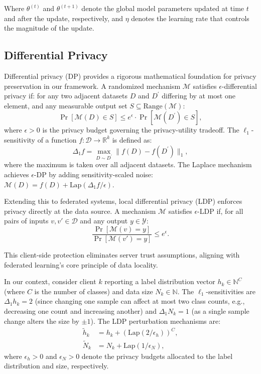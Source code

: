 \documentclass[journal,twoside,web]{ieeecolor}
\begin{document}
Where $\theta^{(t)}$ and $\theta^{(t+1)}$ denote the global model parameters updated at time $t$ and after the update, respectively, and $\eta$ denotes the learning rate that controls the magnitude of the update.

\subsection{Differential Privacy}

Differential privacy (DP) \cite{dp} provides a rigorous mathematical foundation for privacy preservation in our framework. A randomized mechanism \(\mathcal{M}\) satisfies \(\epsilon\)-differential privacy if: for any two adjacent datasets \(D\) and \(D^{\prime}\) differing by at most one element, and any measurable output set \(S \subseteq \text{Range}(\mathcal{M}):\) 
\begin{equation}
\Pr[\mathcal{M}(D) \in S] \leq e^{\epsilon} \cdot \Pr[\mathcal{M}(D^{\prime}) \in S],
\label{eq:dp_def}
\end{equation}
where \(\epsilon > 0\) is the privacy budget governing the privacy-utility tradeoff. The \(\ell_1\)-sensitivity of a function \(f: \mathcal{D} \rightarrow \mathbb{R}^{k}\) is defined as:
\begin{equation}
\Delta_{1} f = \max_{D \sim D^{\prime}} \|f(D) - f(D^{\prime})\|_{1},
\label{eq:sensitivity}
\end{equation}
where the maximum is taken over all adjacent datasets. The Laplace mechanism achieves \(\epsilon\)-DP by adding sensitivity-scaled noise: \(\mathcal{M}(D) = f(D) + \text{Lap}(\Delta_{1} f / \epsilon)\).

Extending this to federated systems, local differential privacy (LDP) \cite{dpprotocols} enforces privacy directly at the data source. A mechanism \(\mathcal{M}\) satisfies \(\epsilon\)-LDP if, for all pairs of inputs \(v, v' \in \mathcal{D}\) and any output \(y \in \mathcal{Y}\):
\begin{equation}
\frac{\Pr[\mathcal{M}(v) = y]}{\Pr[\mathcal{M}(v') = y]} \leq e^{\epsilon}.
\label{eq:ldp_def}
\end{equation}

This client-side protection eliminates server trust assumptions, aligning with federated learning's core principle of data locality.

In our context, consider client \(k\) reporting a label distribution vector \(h_k \in \mathbb{N}^C\) (where \(C\) is the number of classes) and data size \(N_k \in \mathbb{N}\). The \(\ell_1\)-sensitivities are \(\Delta_1 h_k = 2\) (since changing one sample can affect at most two class counts, e.g., decreasing one count and increasing another) and \(\Delta_1 N_k = 1\) (as a single sample change alters the size by \(\pm 1\)). The LDP perturbation mechanisms are:
\begin{align}
\tilde{h}_k &= h_k + \left(\text{Lap}\left(2 / \epsilon_h\right)\right)^C, \label{eq:ldp_label} \\
\tilde{N}_k &= N_k + \text{Lap}\left(1 / \epsilon_N\right), \label{eq:ldp_size}
\end{align}
where \(\epsilon_h > 0\) and \(\epsilon_N > 0\) denote the privacy budgets allocated to the label distribution and size, respectively.
\end{document}
